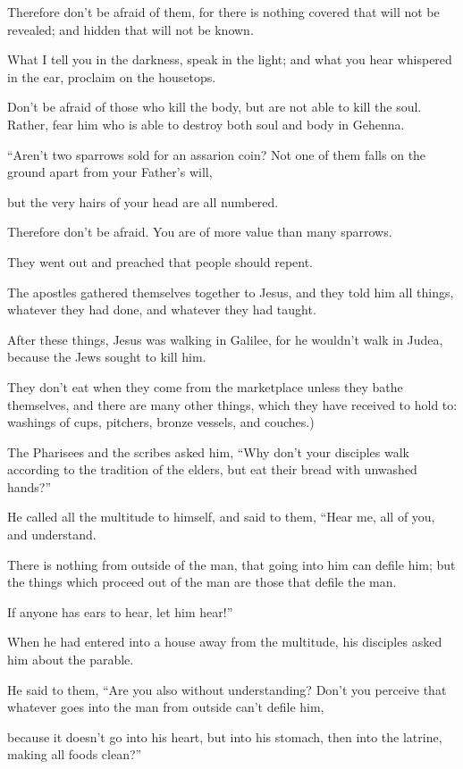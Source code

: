 Therefore don’t be afraid of them, for there is nothing covered that will not be revealed; and hidden that will not be known.

What I tell you in the darkness, speak in the light; and what you hear whispered in the ear, proclaim on the housetops.

Don’t be afraid of those who kill the body, but are not able to kill the soul. Rather, fear him who is able to destroy both soul and body in Gehenna.

“Aren’t two sparrows sold for an assarion coin? Not one of them falls on the ground apart from your Father’s will,

but the very hairs of your head are all numbered.

Therefore don’t be afraid. You are of more value than many sparrows.

They went out and preached that people should repent.

The apostles gathered themselves together to Jesus, and they told him all things, whatever they had done, and whatever they had taught.

After these things, Jesus was walking in Galilee, for he wouldn’t walk in Judea, because the Jews sought to kill him.

They don’t eat when they come from the marketplace unless they bathe themselves, and there are many other things, which they have received to hold to: washings of cups, pitchers, bronze vessels, and couches.)

The Pharisees and the scribes asked him, “Why don’t your disciples walk according to the tradition of the elders, but eat their bread with unwashed hands?”

He called all the multitude to himself, and said to them, “Hear me, all of you, and understand.

There is nothing from outside of the man, that going into him can defile him; but the things which proceed out of the man are those that defile the man.

If anyone has ears to hear, let him hear!”

When he had entered into a house away from the multitude, his disciples asked him about the parable.

He said to them, “Are you also without understanding? Don’t you perceive that whatever goes into the man from outside can’t defile him,

because it doesn’t go into his heart, but into his stomach, then into the latrine, making all foods clean?”

